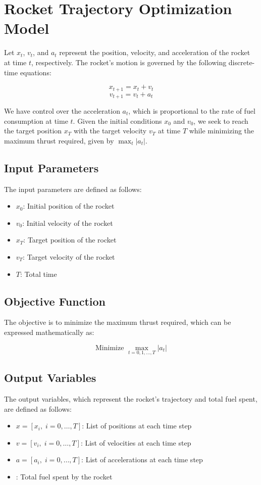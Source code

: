 \documentclass{article}
\begin{document}
\section*{Rocket Trajectory Optimization Model}

Let \( x_t \), \( v_t \), and \( a_t \) represent the position, velocity, and acceleration of the rocket at time \( t \), respectively. The rocket's motion is governed by the following discrete-time equations:

\[
x_{t+1} = x_t + v_t
\]
\[
v_{t+1} = v_t + a_t
\]

We have control over the acceleration \( a_t \), which is proportional to the rate of fuel consumption at time \( t \). Given the initial conditions \( x_0 \) and \( v_0 \), we seek to reach the target position \( x_T \) with the target velocity \( v_T \) at time \( T \) while minimizing the maximum thrust required, given by \( \max_t |a_t| \).

\subsection*{Input Parameters}
The input parameters are defined as follows:

\begin{itemize}
    \item \( x_0 \): Initial position of the rocket
    \item \( v_0 \): Initial velocity of the rocket
    \item \( x_T \): Target position of the rocket
    \item \( v_T \): Target velocity of the rocket
    \item \( T \): Total time
\end{itemize}

\subsection*{Objective Function}
The objective is to minimize the maximum thrust required, which can be expressed mathematically as:

\[
\text{Minimize } \max_{t=0,1,\ldots,T} |a_t|
\]

\subsection*{Output Variables}
The output variables, which represent the rocket's trajectory and total fuel spent, are defined as follows:

\begin{itemize}
    \item \( x = [x_i, \; i = 0, \ldots, T] \): List of positions at each time step
    \item \( v = [v_i, \; i = 0, \ldots, T] \): List of velocities at each time step
    \item \( a = [a_i, \; i = 0, \ldots, T] \): List of accelerations at each time step
    \item {}: Total fuel spent by the rocket
\end{itemize}
\end{document}
